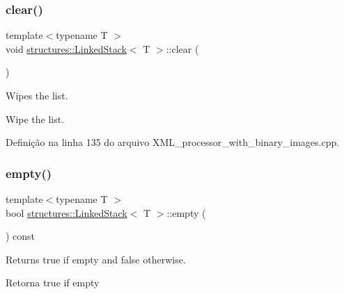 \subsubsection{\texorpdfstring{clear()}{clear()}}
{\footnotesize\ttfamily template$<$typename T $>$ \\
void \mbox{\hyperlink{classstructures_1_1LinkedStack}{structures\+::\+Linked\+Stack}}$<$ T $>$\+::clear (\begin{DoxyParamCaption}{ }\end{DoxyParamCaption})}



Wipes the list. 

Wipe the list. 

Definição na linha 135 do arquivo X\+M\+L\+\_\+processor\+\_\+with\+\_\+binary\+\_\+images.\+cpp.


\begin{DoxyCode}{0}

\end{DoxyCode}
\mbox{\label{classstructures_1_1LinkedStack_ac9704fd697f9c4ed4f7fc4e786114e4f}} 
\subsubsection{\texorpdfstring{empty()}{empty()}}
{\footnotesize\ttfamily template$<$typename T $>$ \\
bool \mbox{\hyperlink{classstructures_1_1LinkedStack}{structures\+::\+Linked\+Stack}}$<$ T $>$\+::empty (\begin{DoxyParamCaption}{ }\end{DoxyParamCaption}) const}



Returns true if empty and false otherwise. 

\begin{DoxyReturn}{Retorna}
true if empty 
\end{DoxyReturn}


